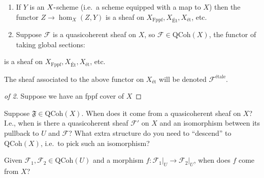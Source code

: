 \begin{theorem}

\envlist

\begin{enumerate}
\def\labelenumi{\arabic{enumi}.}
\item
  If \(Y\) is an \(X{\hbox{-}}\)scheme (i.e.~a scheme equipped with a
  map to \(X\)) then the functor \(Z \to \hom_X(Z, Y)\) is a sheaf on
  \(X_{\mathrm{\operatorname{Fppf}}}, X_{\text{Ét}}, X_{\text{ét}}\),
  etc.
\item
  Suppose \(\mathcal{F}\) is a quasicoherent sheaf on \(X\), so
  \(\mathcal{F}\in {\mathrm{QCoh}}(X)\), the functor of taking global
  sections:
\end{enumerate}

is a sheaf on
\(X_{\mathrm{\operatorname{Fppf}}}, X_{\text{Ét}}, X_{\text{ét}}\), etc.

\end{theorem}

\begin{definition}

The sheaf associated to the above functor on \(X_{\text{ét}}\) will be
denoted \(\mathcal{F}^\text{étale}\).

\end{definition}

\begin{proof}[of 2]

Suppose we have an fppf cover of \(X\)

\end{proof}

\begin{question}

Suppose \(\mathfrak{F}\in {\mathrm{QCoh}}(X)\). When does it come from a
quasicoherent sheaf on \(X\)? I.e., when is there a quasicoherent sheaf
\(\mathcal{F}'\) on \(X\) and an isomorphism between its pullback to
\(U\) and \(\mathcal{F}\)? What extra structure do you need to
``descend'' to \({\mathrm{QCoh}}(X)\), i.e.~to pick such an isomorphism?

\end{question}

\begin{question}

Given \(\mathcal{F}_1, \mathcal{F}_2 \in {\mathrm{QCoh}}(U)\) and a
morphism
\(f: { \left.{{\mathcal{F}_1}} \right|_{{U}} } \to { \left.{{\mathcal{F}_2}} \right|_{{U}} }\),
when does \(f\) come from \(X\)?

\end{question}

